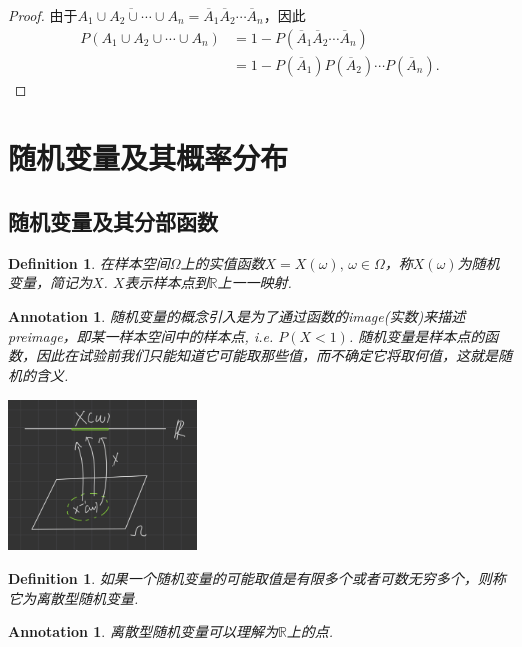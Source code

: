 \documentclass{article}
\newtheorem{definition}[theorem]{Definition}
\newtheorem{annotation}[theorem]{Annotation}
\begin{document}
\begin{proof}
由于$\overline{A_1\cup A_2 \cup \cdots \cup A_n} = \overline{A}_1\overline{A}_2\cdots\overline{A}_n$，因此
$$
\begin{array}{ll}
P(A_1 \cup A_2 \cup \cdots \cup A_n) &= 1-P(\overline{A}_1\overline{A}_2\cdots\overline{A}_n)\\
&= 1 - P(\overline{A}_1)P(\overline{A}_2)\cdots P(\overline{A}_n).
\end{array}
$$
\end{proof}


\newpage
\section{随机变量及其概率分布}

\subsection{随机变量及其分部函数}

\begin{definition}
\rm 在样本空间$\Omega$上的实值函数$X=X(\omega),\, \omega \in \Omega$，称$X(\omega)$为{\color{red}随机变量}，简记为$X$. $X$表示样本点到$\mathbb{R}$上一一映射.  
\end{definition}

\begin{annotation}
\rm 随机变量的概念引入是为了通过函数的image(实数)来描述preimage，即某一样本空间中的样本点, i.e. $P(X < 1)$. 随机变量是样本点的函数，因此在试验前我们只能知道它可能取那些值，而不确定它将取何值，这就是随机的含义. 
\begin{center}
\includegraphics[width=5cm, height=4cm]{images/random_variable.jpg}
\end{center}
\end{annotation}

\begin{definition}
\rm 如果一个随机变量的可能取值是有限多个或者可数无穷多个，则称它为{\color{red}离散型随机变量}.
\end{definition}

\begin{annotation}
\rm 离散型随机变量可以理解为$\mathbb{R}$上的点.
\end{annotation}
\end{document}
